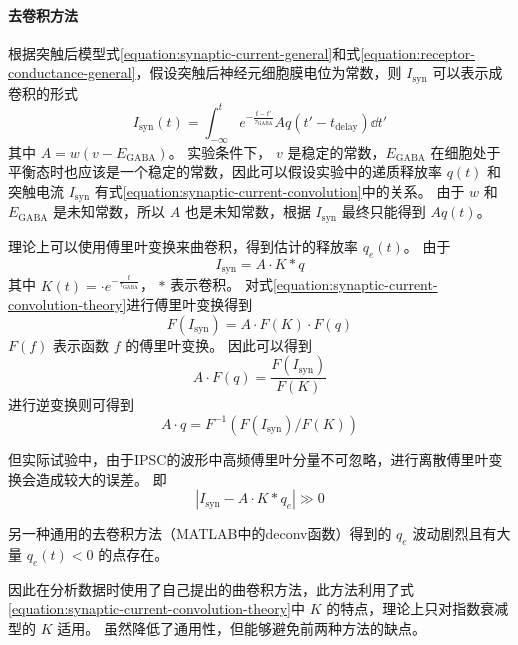 \paragraph{去卷积方法}
根据突触后模型式\ref{equation:synaptic-current-general}和式\ref{equation:receptor-conductance-general}，假设突触后神经元细胞膜电位为常数，则 $I_\text{syn}$ 可以表示成卷积的形式
\begin{equation}
I_\text{syn}(t) = \int_{-\infty}^t e^{-\frac{t - t'}{\tau_\text{GABA}}} A q(t' - t_\text{delay}) \dd{t'}
\label{equation:synaptic-current-convolution}
\end{equation}
其中 $A = w(v - E_\text{GABA})$。
实验条件下， $v$ 是稳定的常数，$E_\text{GABA}$ 在细胞处于平衡态时也应该是一个稳定的常数，因此可以假设实验中的递质释放率 $q(t)$ 和 突触电流 $I_\text{syn}$ 有式\ref{equation:synaptic-current-convolution}中的关系。
由于 $w$ 和 $E_\text{GABA}$ 是未知常数，所以 $A$ 也是未知常数，根据 $I_\text{syn}$ 最终只能得到 $Aq(t)$。

理论上可以使用傅里叶变换来曲卷积，得到估计的释放率 $q_e(t)$。
由于
\begin{equation}
I_\text{syn} = A \cdot K * q
\label{equation:synaptic-current-convolution-theory}
\end{equation}
其中 $K(t) = \cdot e^{-\frac{t}{\tau_\text{GABA}}}$， $*$ 表示卷积。
对式\ref{equation:synaptic-current-convolution-theory}进行傅里叶变换得到
\begin{equation}
F(I_\text{syn}) = A \cdot F(K) \cdot F(q)
\label{equation:synaptic-current-fourier-transformation}
\end{equation}
$F(f)$ 表示函数 $f$ 的傅里叶变换。
因此可以得到
\begin{equation}
A \cdot F(q) = \frac{F(I_\text{syn})}{F(K)}
\label{equation:release-rate-fourier}
\end{equation}
进行逆变换则可得到
\begin{equation}
A \cdot q = F^{-1}\left( F(I_\text{syn}) / F(K) \right)
\end{equation}

但实际试验中，由于IPSC的波形中高频傅里叶分量不可忽略，进行离散傅里叶变换会造成较大的误差。
即
\begin{equation}
\left| I_\text{syn} - A \cdot K * q_e \right| \gg 0
\label{equation:deconvolution-error}
\end{equation}

另一种通用的去卷积方法（MATLAB中的deconv函数）得到的 $q_e$ 波动剧烈且有大量 $q_e(t) < 0$ 的点存在。

因此在分析数据时使用了自己提出的曲卷积方法，此方法利用了式\ref{equation:synaptic-current-convolution-theory}中 $K$ 的特点，理论上只对指数衰减型的 $K$ 适用。
虽然降低了通用性，但能够避免前两种方法的缺点。

